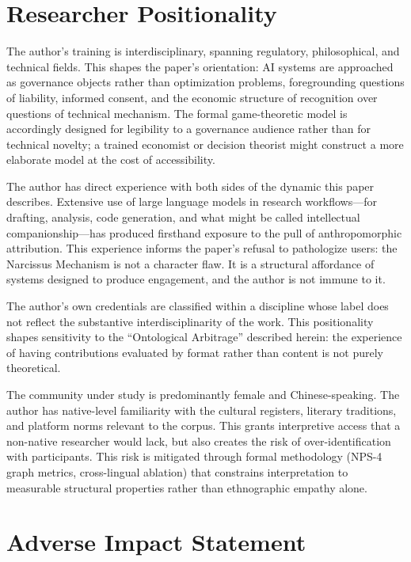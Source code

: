 \section*{Researcher Positionality}

The author's training is interdisciplinary, spanning regulatory, philosophical,
and technical fields. This shapes the paper's orientation: AI systems are
approached as governance objects rather than optimization problems, foregrounding
questions of liability, informed consent, and the economic structure of
recognition over questions of technical mechanism. The formal game-theoretic
model is accordingly designed for legibility to a governance audience rather
than for technical novelty; a trained economist or decision theorist might
construct a more elaborate model at the cost of accessibility.

The author has direct experience with both sides of the dynamic this paper
describes. Extensive use of large language models in research
workflows—for drafting, analysis, code generation, and what might be called
intellectual companionship—has produced firsthand exposure to the pull of
anthropomorphic attribution. This experience informs the paper's refusal to
pathologize users: the Narcissus Mechanism is not a character flaw. It is a
structural affordance of systems designed to produce engagement, and the
author is not immune to it.

The author's own credentials are classified within a discipline whose label
does not reflect the substantive interdisciplinarity of the work. This
positionality shapes sensitivity to the ``Ontological Arbitrage'' described
herein: the experience of having contributions evaluated by format rather
than content is not purely theoretical.

The community under study is predominantly female and Chinese-speaking. The
author has native-level familiarity with the cultural registers, literary
traditions, and platform norms relevant to
the corpus. This grants interpretive access that a non-native researcher
would lack, but also creates the risk of over-identification with
participants. This risk is mitigated through formal methodology (NPS-4
graph metrics, cross-lingual ablation) that constrains interpretation to
measurable structural properties rather than ethnographic empathy alone.

\section*{Adverse Impact Statement}

